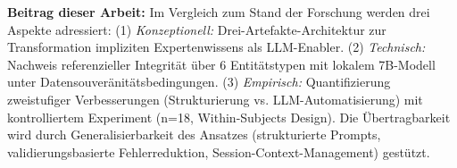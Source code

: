 \noindent \textbf{Beitrag dieser Arbeit:} Im Vergleich zum Stand der Forschung werden drei Aspekte adressiert: (1) \textit{Konzeptionell:} Drei-Artefakte-Architektur zur Transformation impliziten Expertenwissens als LLM-Enabler. (2) \textit{Technisch:} Nachweis referenzieller Integrität über 6 Entitätstypen mit lokalem 7B-Modell unter Datensouveränitätsbedingungen. (3) \textit{Empirisch:} Quantifizierung zweistufiger Verbesserungen (Strukturierung vs. LLM-Automatisierung) mit kontrolliertem Experiment (n=18, Within-Subjects Design). Die Übertragbarkeit wird durch Generalisierbarkeit des Ansatzes (strukturierte Prompts, validierungsbasierte Fehlerreduktion, Session-Context-Management) gestützt.

